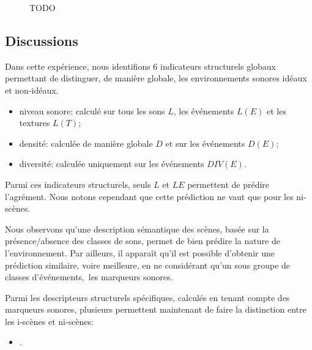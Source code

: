 \begin{figure}[t]
       \caption[TODO]{TODO}\label{fig:soundlevelMarkerDiff}
\end{figure}




\subsection{Discussions}

Dans cette expérience, nous identifions 6 indicateurs structurels globaux permettant de distinguer, de manière globale, les environnements sonores idéaux et non-idéaux.

\begin{itemize}
\item niveau sonore: calculé sur tous les sons $L$, les événements $L(E)$ et les textures $L(T)$; 
\item densité: calculée de manière globale $D$ et sur les événements $D(E)$;
\item diversité: calculée uniquement sur les événements $DIV(E)$.
\end{itemize}

Parmi ces indicateurs structurels, seuls $L$ et $LE$ permettent de prédire l'agrément. Nous notons cependant que cette prédiction ne vaut que pour les ni-scènes. 

Nous observons qu'une description sémantique des scènes, basée sur la présence/absence des classes de sons, permet de bien prédire la nature de l'environnement. Par ailleurs, il apparaît qu'il est possible d'obtenir une prédiction similaire, voire meilleure, en ne considérant qu'un sous groupe de classes d'événements,\ie~les marqueurs sonores.

Parmi les descripteurs structurels spécifiques, calculés en tenant compte des marqueurs sonores, plusieurs permettent maintenant de faire la distinction entre les i-scènes et ni-scènes:

\begin{itemize}
\item {}.
\end{itemize}

